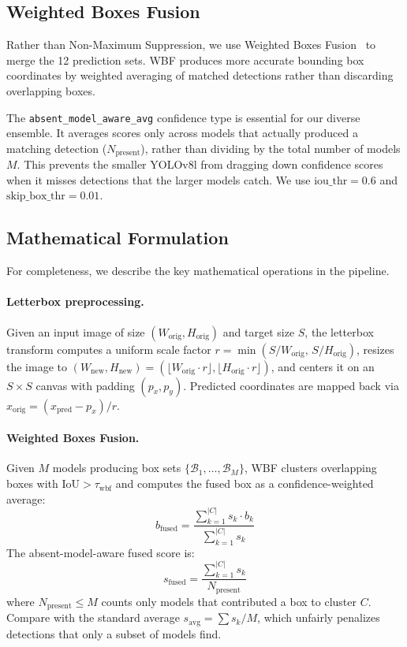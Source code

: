 \documentclass[11pt,a4paper]{article}
\begin{document}
\subsection{Weighted Boxes Fusion}

Rather than Non-Maximum Suppression, we use Weighted Boxes Fusion~\cite{solovyev2021wbf} to merge the 12 prediction sets.
WBF produces more accurate bounding box coordinates by weighted averaging of matched detections rather than discarding overlapping boxes.

The \texttt{absent\_model\_aware\_avg} confidence type is essential for our diverse ensemble.
It averages scores only across models that actually produced a matching detection ($N_{\text{present}}$), rather than dividing by the total number of models $M$.
This prevents the smaller YOLOv8l from dragging down confidence scores when it misses detections that the larger models catch.
We use $\text{iou\_thr} = 0.6$ and $\text{skip\_box\_thr} = 0.01$.

\subsection{Mathematical Formulation}

For completeness, we describe the key mathematical operations in the pipeline.

\paragraph{Letterbox preprocessing.}
Given an input image of size $(W_{\text{orig}}, H_{\text{orig}})$ and target size $S$, the letterbox transform computes a uniform scale factor $r = \min(S/W_{\text{orig}},\, S/H_{\text{orig}})$, resizes the image to $(W_{\text{new}}, H_{\text{new}}) = (\lfloor W_{\text{orig}} \cdot r \rfloor, \lfloor H_{\text{orig}} \cdot r \rfloor)$, and centers it on an $S \times S$ canvas with padding $(p_x, p_y)$.
Predicted coordinates are mapped back via $x_{\text{orig}} = (x_{\text{pred}} - p_x) / r$.

\paragraph{Weighted Boxes Fusion.}
Given $M$ models producing box sets $\{\mathcal{B}_1, \ldots, \mathcal{B}_M\}$, WBF clusters overlapping boxes with $\text{IoU} > \tau_{\text{wbf}}$ and computes the fused box as a confidence-weighted average:
\begin{equation}
    b_{\text{fused}} = \frac{\sum_{k=1}^{|C|} s_k \cdot b_k}{\sum_{k=1}^{|C|} s_k}
    \label{eq:wbf_box}
\end{equation}
The absent-model-aware fused score is:
\begin{equation}
    s_{\text{fused}} = \frac{\sum_{k=1}^{|C|} s_k}{N_{\text{present}}}
    \label{eq:absent_aware}
\end{equation}
where $N_{\text{present}} \leq M$ counts only models that contributed a box to cluster $C$.
Compare with the standard average $s_{\text{avg}} = \sum s_k / M$, which unfairly penalizes detections that only a subset of models find.
\end{document}
